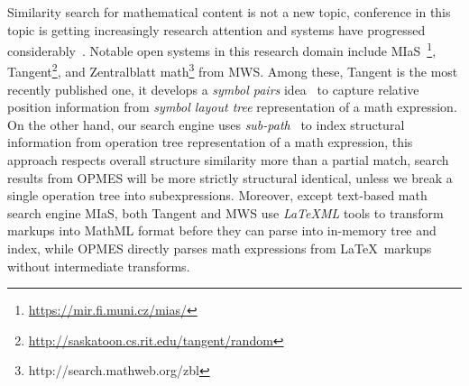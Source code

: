 \documentclass{llncs}
\begin{document}
Similarity search for mathematical content is not a new topic, conference in this topic is getting increasingly research attention and systems have progressed considerably~\cite{ov}.
Notable open systems in this research domain include 
MIaS~\footnote{\url{https://mir.fi.muni.cz/mias/}}, 
Tangent\footnote{\url{http://saskatoon.cs.rit.edu/tangent/random}},
and Zentralblatt math\footnote{http://search.mathweb.org/zbl} from MWS.
Among these, 
Tangent is the most recently published one, it develops a \textit{symbol pairs} idea~\cite{symbolpairs14,symbolpairs15} to capture relative position information from \textit{symbol layout tree} representation of a math expression.
On the other hand, our search engine uses \textit{sub-path}~\cite{signifjap} to index structural information from operation tree representation of a math expression, this approach respects overall structure similarity more than a partial match, search results from OPMES will be more strictly structural identical, unless we break a single operation tree into subexpressions.
Moreover, except text-based math search engine MIaS, both Tangent and MWS use \textit{LaTeXML} tools to transform  markups into MathML format before they can parse into in-memory tree and index, while OPMES directly parses math expressions from \LaTeX\ markups without intermediate transforms. 
\end{document}

